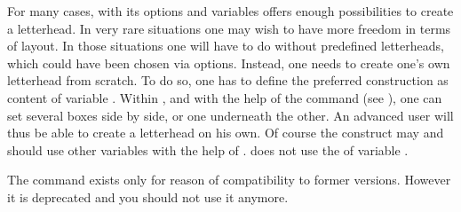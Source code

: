 \begin{Declaration}
\end{Declaration}
%
%
For many cases,  with its options and variables offers
enough possibilities to create a letterhead. In very rare situations
one may wish to have more freedom in terms of layout. In those
situations one will have to do without predefined letterheads, which
could have been chosen via options. Instead, one needs to create one's
own letterhead from scratch. To do so, one has to define the preferred
construction as content of variable . Within
, and with the help of the  command
(see \cite{latex:usrguide}), one can set several boxes side by side,
or one underneath the other. An advanced user will thus be able to
create a letterhead on his own. Of course the construct may
and should use other variables with the help of
. \KOMAScript{} does not use the
 of variable .

The command
 exists only for reason of
compatibility to former  versions. However it is deprecated
and you should not use it anymore.%
%
\EndIndexGroup


